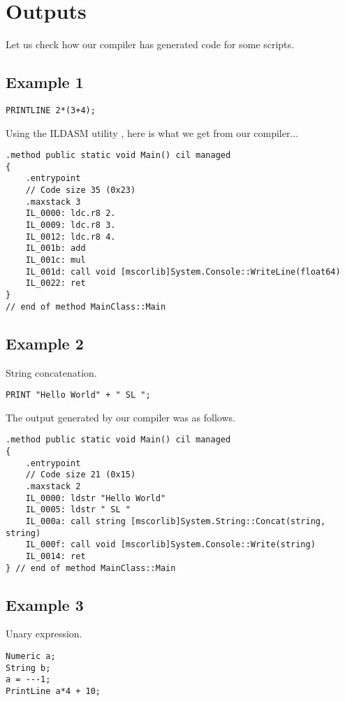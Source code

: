 \section{Outputs}
Let us check how our compiler has generated code for some scripts.
\subsection{Example 1}
\lstset{style=csharp}
\begin{lstlisting}
PRINTLINE 2*(3+4);
\end{lstlisting}

Using the ILDASM utility , here is what we get from our compiler...

\lstset{style=csharp}
\begin{lstlisting}
.method public static void Main() cil managed
{
	.entrypoint
	// Code size 35 (0x23)
	.maxstack 3
	IL_0000: ldc.r8 2.
	IL_0009: ldc.r8 3.
	IL_0012: ldc.r8 4.
	IL_001b: add
	IL_001c: mul
	IL_001d: call void [mscorlib]System.Console::WriteLine(float64)
	IL_0022: ret
}
// end of method MainClass::Main
\end{lstlisting}
\subsection{Example 2}
String concatenation.
\lstset{style=csharp}
\begin{lstlisting}
PRINT "Hello World" + " SL ";
\end{lstlisting}

The output generated by our compiler was as follows.

\lstset{style=csharp}
\begin{lstlisting}
.method public static void Main() cil managed
{
	.entrypoint
	// Code size 21 (0x15)
	.maxstack 2
	IL_0000: ldstr "Hello World"
	IL_0005: ldstr " SL "
	IL_000a: call string [mscorlib]System.String::Concat(string, string)
	IL_000f: call void [mscorlib]System.Console::Write(string)
	IL_0014: ret
} // end of method MainClass::Main
\end{lstlisting}

\subsection{Example 3}
Unary expression.
\lstset{style=csharp}
\begin{lstlisting}
Numeric a;
String b;
a = ---1;
PrintLine a*4 + 10;
\end{lstlisting}

